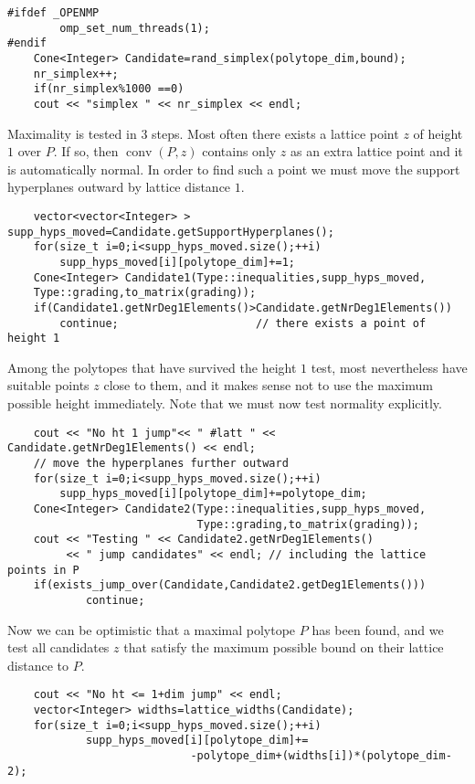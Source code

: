 \begin{small}
\begin{Verbatim}
#ifdef _OPENMP
        omp_set_num_threads(1);
#endif
    Cone<Integer> Candidate=rand_simplex(polytope_dim,bound);
    nr_simplex++;
    if(nr_simplex%1000 ==0)
    cout << "simplex " << nr_simplex << endl;
\end{Verbatim}
Maximality is tested in $3$ steps. Most often there exists a lattice point $z$ of height $1$ over $P$. If so, then $\operatorname{conv}(P,z)$ contains only $z$ as an extra lattice point and it is automatically normal. In order to find such a point we must move the support hyperplanes outward by lattice distance $1$.
\begin{Verbatim}
    vector<vector<Integer> > supp_hyps_moved=Candidate.getSupportHyperplanes();
    for(size_t i=0;i<supp_hyps_moved.size();++i)
        supp_hyps_moved[i][polytope_dim]+=1;
    Cone<Integer> Candidate1(Type::inequalities,supp_hyps_moved, 
    Type::grading,to_matrix(grading));
    if(Candidate1.getNrDeg1Elements()>Candidate.getNrDeg1Elements()) 
        continue;                     // there exists a point of height 1
\end{Verbatim}
Among the polytopes that have survived the height $1$ test, most nevertheless have suitable points $z$ close to them, and it makes sense not to use the maximum possible height immediately. Note that we must now test normality explicitly.
\begin{Verbatim}
    cout << "No ht 1 jump"<< " #latt " << Candidate.getNrDeg1Elements() << endl; 
    // move the hyperplanes further outward
    for(size_t i=0;i<supp_hyps_moved.size();++i)
        supp_hyps_moved[i][polytope_dim]+=polytope_dim; 
    Cone<Integer> Candidate2(Type::inequalities,supp_hyps_moved,
                             Type::grading,to_matrix(grading));
    cout << "Testing " << Candidate2.getNrDeg1Elements() 
         << " jump candidates" << endl; // including the lattice points in P
    if(exists_jump_over(Candidate,Candidate2.getDeg1Elements()))
            continue;
\end{Verbatim}
Now we can be optimistic that a maximal polytope $P$ has been found, and we test all candidates $z$ that satisfy the maximum possible bound on their lattice distance to $P$.
\begin{Verbatim}
    cout << "No ht <= 1+dim jump" << endl;
    vector<Integer> widths=lattice_widths(Candidate);
    for(size_t i=0;i<supp_hyps_moved.size();++i)
            supp_hyps_moved[i][polytope_dim]+=
                            -polytope_dim+(widths[i])*(polytope_dim-2);
\end{Verbatim}

\end{small}
